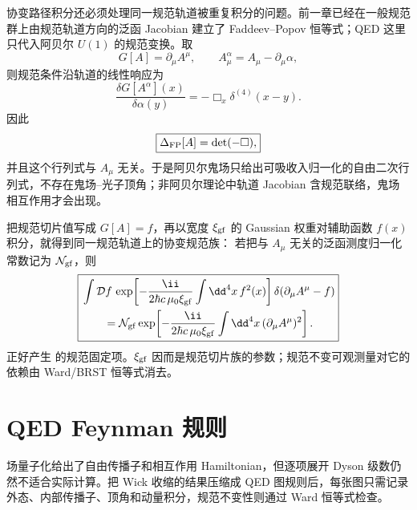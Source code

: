 协变路径积分还必须处理同一规范轨道被重复积分的问题。前一章已经在一般规范群上由规范轨道方向的泛函 Jacobian 建立了 Faddeev--Popov 恒等式；QED 这里只代入阿贝尔 $U(1)$ 的规范变换。取
\begin{equation*}
 G[A]=\partial_\mu A^\mu,
 \qquad
 A_\mu^\alpha=A_\mu-\partial_\mu\alpha,
\end{equation*}
则规范条件沿轨道的线性响应为
\begin{equation*}
 \frac{\delta G[A^\alpha](x)}{\delta\alpha(y)}
 =-\Box_x\delta^{(4)}(x-y).
\end{equation*}
因此
\begin{equation}
 \boxed{
 \Delta_{\rm FP}[A]=\det(-\Box),}
 \label{eq:FP-QED-det-r8}
\end{equation}
并且这个行列式与 $A_\mu$ 无关。于是阿贝尔鬼场只给出可吸收入归一化的自由二次行列式，不存在鬼场--光子顶角；非阿贝尔理论中轨道 Jacobian 含规范联络，鬼场相互作用才会出现。

把规范切片值写成 $G[A]=f$，再以宽度 $\xi_{\rm gf}$ 的 Gaussian 权重对辅助函数 $f(x)$ 积分，就得到同一规范轨道上的协变规范族：
若把与 $A_\mu$ 无关的泛函测度归一化常数记为 $\mathcal N_{\rm gf}$，则
\begin{equation}
 \boxed{
 \begin{aligned}
 &\int\mathcal Df\,
 \exp\!\left[-\frac{\ii}{2\hbar c\,\mu_0\xi_{\rm gf}}
 \int\dd^4 x\,f^2(x)\right]
 \delta\!\left(\partial_\mu A^\mu-f\right)\\
 &\qquad=
 \mathcal N_{\rm gf}
 \exp\!\left[-\frac{\ii}{2\hbar c\,\mu_0\xi_{\rm gf}}
 \int\dd^4 x\,(\partial_\mu A^\mu)^2\right].
 \end{aligned}}
 \label{eq:FP-gaussian-average-r8}
\end{equation}
 正好产生 的规范固定项。$\xi_{\rm gf}$ 因而是规范切片族的参数；规范不变可观测量对它的依赖由 Ward/BRST 恒等式消去。





\section{QED Feynman 规则}\label{sec:feqo-light-coupling}

场量子化给出了自由传播子和相互作用 Hamiltonian，但逐项展开 Dyson 级数仍然不适合实际计算。把 Wick 收缩的结果压缩成 QED 图规则后，每张图只需记录外态、内部传播子、顶角和动量积分，规范不变性则通过 Ward 恒等式检查。

